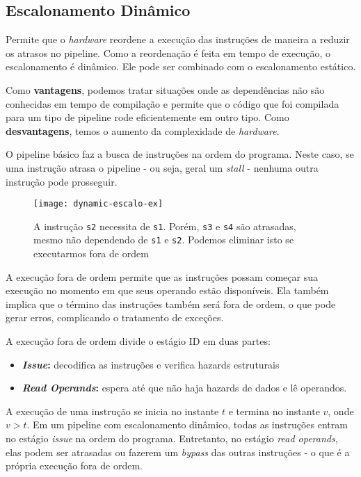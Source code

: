 \subsection{Escalonamento Dinâmico}
Permite que o \textit{hardware} reordene a execução das instruções de maneira a reduzir os atrasos no pipeline. Como a reordenação é feita em tempo de execução, o escalonamento é dinâmico. Ele pode ser combinado com o escalonamento estático.

Como \textbf{vantagens}, podemos tratar situações onde as dependências não são conhecidas em tempo de compilação e permite que o código que foi compilada para um tipo de pipeline rode eficientemente em outro tipo. Como \textbf{desvantagens}, temos o aumento da complexidade de \textit{hardware}.

O pipeline básico faz a busca de instruções na ordem do programa. Neste caso, se uma instrução atrasa o pipeline - ou seja, geral um \textit{stall} - nenhuma outra instrução pode prosseguir.

\begin{figure}[ht]
  \centering
  \texttt{[image: dynamic-escalo-ex]}
  \caption{A instrução \texttt{s2} necessita de \texttt{s1}. Porém, \texttt{s3} e \texttt{s4} são atrasadas, mesmo não dependendo de \texttt{s1} e \texttt{s2}. Podemos eliminar isto se executarmos fora de ordem}
  \label{fig:dynamic-escalo-ex}
\end{figure}

A execução fora de ordem permite que as instruções possam começar sua execução no momento em que seus operando estão disponíveis. Ela também implica que o término das instruções também será fora de ordem, o que pode gerar erros, complicando o tratamento de exceções.

A execução fora de ordem divide o estágio ID em duas partes:
\begin{itemize}
  \item \textbf{\textit{Issue}:} decodifica as instruções e verifica hazards estruturais

  \item \textbf{\textit{Read Operands}:} espera até que não haja hazards de dados e lê operandos.
\end{itemize}

A execução de uma instrução se inicia no instante $t$ e termina no instante $v$, onde $v > t$. Em um pipeline com escalonamento dinâmico, todas as instruções entram no estágio \textit{issue} na ordem do programa. Entretanto, no estágio \textit{read operands}, elas podem ser atrasadas ou fazerem um \textit{bypass} das outras instruções - o que é a própria execução fora de ordem.



